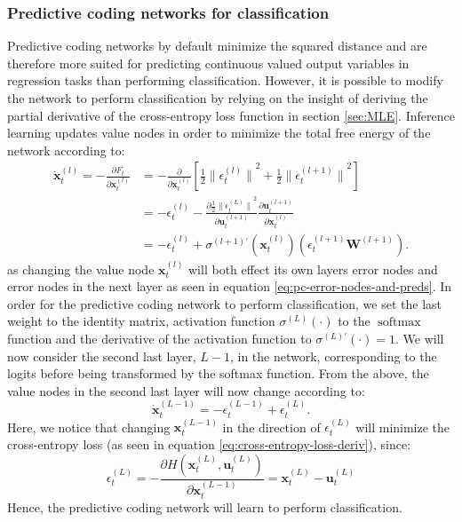 \documentclass[a4paper,11pt]{article}
\DeclareMathOperator{\softmax}{softmax}
\begin{document}
\subsubsection{Predictive coding networks for classification}
Predictive coding networks by default minimize the squared distance and are therefore more suited for predicting continuous valued output variables in regression tasks than performing classification. However, it is possible to modify the network to perform classification by relying on the insight of deriving the partial derivative of the cross-entropy loss function in section \ref{sec:MLE}. Inference learning updates value nodes in order to minimize the total free energy of the network according to:
\begin{equation} \label{eq:value-node-derivative}
  \begin{split}
  \dot{\mathbf{x}}_t^{(l)} = -\frac{\partial F_t}{\partial \mathbf{x}_t^{(l)}} & = - \frac{\partial }{\partial \mathbf{x}_t^{(l)}} \left[ \frac{1}{2} {\lVert \epsilon_t^{(l)} \rVert}^2 + \frac{1}{2} {\lVert \epsilon_t^{(l+1)} \rVert}^2  \right] \\
  & = -\epsilon_t^{(l)} - \frac{\partial \frac{1}{2} {\lVert \epsilon_t^{(L)} \rVert}^2}{\partial \mathbf{u}_t^{(l+1)}} \frac{\partial \mathbf{u}_t^{(l+1)}}{\partial \mathbf{x}_t^{(l)}} \\
  & = -\epsilon_{t}^{(l)}+\sigma^{(l+1)\prime}(\mathbf{x}_{t}^{(l)})(\epsilon_{t}^{(l+1)} \mathbf{W}^{(l+1)}).
  \end{split}
\end{equation}
as changing the value node $\mathbf{x}_t^{(l)}$ will both effect its own layers error nodes and error nodes in the next layer as seen in equation \ref{eq:pc-error-nodes-and-preds}. In order for the predictive coding network to perform classification, we set the last weight to the identity matrix, activation function $\sigma^{(L)}(\cdot)$ to the $\softmax$ function and the derivative of the activation function to $\sigma^{(L)\prime}(\cdot) = 1$. We will now consider the second last layer, $L-1$, in the network, corresponding to the logits before being transformed by the softmax function. From the above, the value nodes in the second last layer will now change according to:
\begin{equation}
  \dot{\mathbf{x}}_{t}^{(L-1)} = -\epsilon_{t}^{(L-1)} + \epsilon_{t}^{(L)}.
\end{equation}
Here, we notice that changing $\mathbf{x}_t^{(L-1)}$ in the direction of $\epsilon_{t}^{(L)}$ will minimize the cross-entropy loss (as seen in equation \ref{eq:cross-entropy-loss-deriv}), since:
\begin{equation}
  \epsilon_{t}^{(L)} = -\frac{\partial H(\mathbf{x}_t^{(L)}, \mathbf{u}_t^{(L)})}{\partial \mathbf{x}_t^{(L-1)}} = \mathbf{x}_t^{(L)} - \mathbf{u}_t^{(L)}
\end{equation}
Hence, the predictive coding network will learn to perform classification. 
\end{document}
